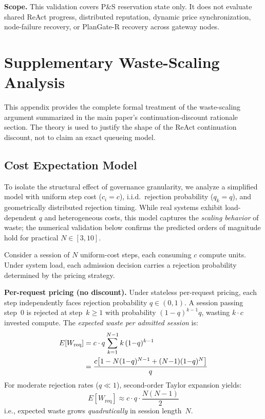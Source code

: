 \documentclass[sigconf,anonymous]{acmart}
\begin{document}
\textbf{Scope.} This validation covers P\&S reservation state only. It does not evaluate shared ReAct progress, distributed reputation, dynamic price synchronization, node-failure recovery, or PlanGate-R recovery across gateway nodes.


\section{Supplementary Waste-Scaling Analysis}
\label{sec:theory_proof}
\label{app:theory}

This appendix provides the complete formal treatment of the waste-scaling argument summarized in the main paper's continuation-discount rationale section. The theory is used to justify the shape of the ReAct continuation discount, not to claim an exact queueing model.

\subsection*{Cost Expectation Model}

To isolate the structural effect of governance granularity, we analyze a simplified model with uniform step cost ($c_i = c$), i.i.d.\ rejection probability ($q_k = q$), and geometrically distributed rejection timing. While real systems exhibit load-dependent $q$ and heterogeneous costs, this model captures the \emph{scaling behavior} of waste; the numerical validation below confirms the predicted orders of magnitude hold for practical $N \in [3,10]$.

Consider a session of $N$ uniform-cost steps, each consuming $c$ compute units. Under system load, each admission decision carries a rejection probability determined by the pricing strategy.

\textbf{Per-request pricing (no discount).}
Under stateless per-request pricing, each step independently faces rejection probability $q \in (0,1)$. A session passing step~0 is rejected at step~$k \geq 1$ with probability $(1{-}q)^{k-1}q$, wasting $k \cdot c$ invested compute. The \emph{expected waste per admitted session} is:
\begin{align}
E[W_{\text{req}}] &= c \cdot q \sum_{k=1}^{N-1} k\,(1{-}q)^{k-1} \notag\\
&= \frac{c\bigl[1 - N(1{-}q)^{N-1} + (N{-}1)(1{-}q)^N\bigr]}{q}
\label{eq:wreq}
\end{align}
For moderate rejection rates ($q \ll 1$), second-order Taylor expansion yields:
\begin{equation}
E[W_{\text{req}}] \approx c \cdot q \cdot \frac{N(N{-}1)}{2}
\label{eq:wreq_approx}
\end{equation}
i.e., expected waste grows \emph{quadratically} in session length~$N$.
\end{document}
